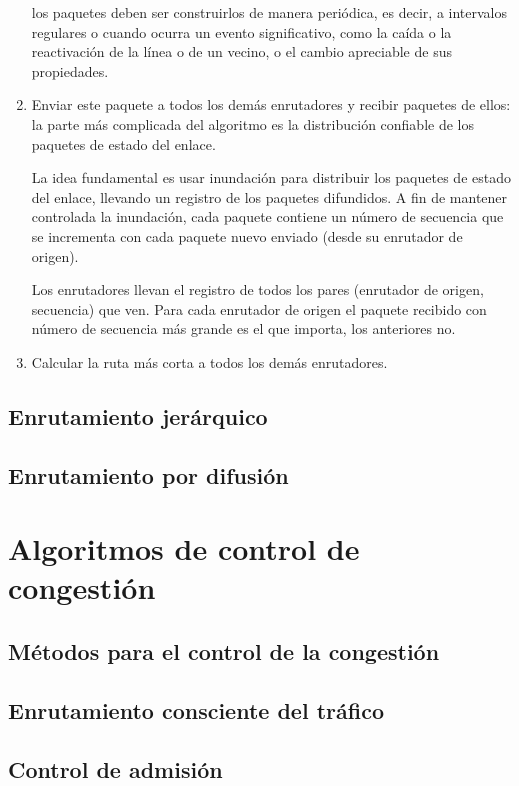 \documentclass[10pt,a4paper]{report}
\begin{document}
\begin{enumerate}
		\par los paquetes deben ser construirlos de manera periódica, es decir, a 
		intervalos regulares o cuando ocurra un evento significativo, como la caída o la 
		reactivación de la línea o de un vecino, o el cambio apreciable de sus propiedades.

		\item Enviar este paquete a todos los demás enrutadores y recibir paquetes de 		
		ellos: la parte más complicada del algoritmo es la distribución confiable de los 
		paquetes de estado del enlace.
		
		\par La idea fundamental es usar inundación para distribuir los paquetes de 
		estado 
		del enlace, llevando un registro de los paquetes difundidos. A fin de mantener 
		controlada la inundación, cada paquete contiene un número de secuencia que se 
		incrementa con cada paquete nuevo enviado (desde su enrutador de origen).
		\par Los enrutadores llevan el registro de todos los pares (enrutador de origen, 
		secuencia) que ven. Para cada enrutador de origen el paquete recibido con 
		número de secuencia más grande es el que importa, los anteriores no.

		\item Calcular la ruta más corta a todos los demás enrutadores.
	\end{enumerate}



\subsection{Enrutamiento jerárquico}
\subsection{Enrutamiento por difusión}
\section{Algoritmos de control de congestión}
\subsection{Métodos para el control de la congestión}
\subsection{Enrutamiento consciente del tráfico}
\subsection{Control de admisión}
\end{document}
